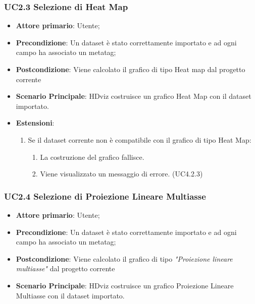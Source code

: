 \subsubsection{UC2.3 Selezione di Heat Map}
\label{ssub:UC2.3}
\begin{itemize}

    \item \textbf{Attore primario}: Utente;

	\item \textbf{Precondizione}:   Un dataset è stato correttamente importato e ad ogni campo 
									ha associato un metatag;

    \item \textbf{Postcondizione}:  Viene calcolato il grafico di tipo Heat map dal progetto corrente
	\item \textbf{Scenario Principale}: HDviz costruisce un grafico Heat Map con il dataset importato.
	\item \textbf{Estensioni}:
	\begin{enumerate}
		\item Se il dataset corrente non è compatibile con il grafico di tipo Heat Map:
		\begin{enumerate}
			\item La costruzione del grafico fallisce.
			\item Viene visualizzato un messaggio di errore. (UC4.2.3)
		\end{enumerate}
	\end{enumerate}
\end{itemize}


\subsubsection{UC2.4 Selezione di Proiezione Lineare Multiasse}
\label{ssub:UC2.4}
\begin{itemize}

    \item \textbf{Attore primario}: Utente;

    \item \textbf{Precondizione}:   Un dataset è stato correttamente importato e ad ogni campo ha associato
                                    un metatag;

    \item \textbf{Postcondizione}:  Viene calcolato il grafico di tipo \emph{"Proiezione lineare multiasse"} dal progetto corrente

	\item \textbf{Scenario Principale}: HDviz costruisce un grafico Proiezione Lineare Multiasse con il dataset importato.
\end{itemize}


